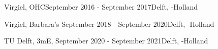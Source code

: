 \begin{rSection}{}

{%
  \begin{experienceItem}{Virgiel, OHC}{September 2016 - September 2017}{}{Delft, -Holland}
\end{experienceItem}}{}

  \begin{experienceItem}{Virgiel, Barbara's }{September 2018 - September 2020}{}{Delft, -Holland}
  \end{experienceItem}

  \begin{experienceItem}
    {TU Delft, 3mE, }{September 2020 - September 2021}{}{Delft, -Holland}
  \end{experienceItem}

\end{rSection}

